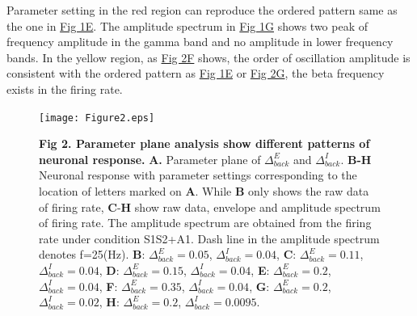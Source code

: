 \documentclass[10pt,letterpaper]{article}
\begin{document}
Parameter setting in the red region can reproduce the ordered pattern same as the one in \hyperlink{fig:fig1}{Fig 1E}. The amplitude spectrum in \hyperlink{fig:fig2}{Fig 1G} shows two peak of frequency amplitude in the gamma band and no amplitude in lower frequency bands.
In the yellow region, as \hyperlink{fig:fig2}{Fig 2F} shows, the order of oscillation amplitude is consistent with the ordered pattern as \hyperlink{fig:fig1}{Fig 1E} or \hyperlink{fig:fig2}{Fig 2G}, the beta frequency exists in the firing rate.

\begin{figure}[!h]
\begin{adjustwidth}{-2in}{0.3in} %
\centering
\texttt{[image: Figure2.eps]}
\begin{flushleft} {\bf Fig 2. Parameter plane analysis show different patterns of neuronal response.}
\textbf{A.} Parameter plane of $\Delta_{back}^{E}$ and $\Delta_{back}^{I}$. \textbf{B-H} Neuronal response with parameter settings corresponding to the location of letters marked on \textbf{A}. While \textbf{B} only shows the raw data of firing rate, \textbf{C}-\textbf{H} show raw data, envelope and amplitude spectrum of firing rate. The amplitude spectrum are obtained from the firing rate under condition S1S2+A1. Dash line in the amplitude spectrum denotes f=25(Hz). \textbf{B}: $\Delta_{back}^{E}=0.05$, $\Delta_{back}^{I}=0.04$, \textbf{C}: $\Delta_{back}^{E}=0.11$, $\Delta_{back}^{I}=0.04$, \textbf{D}: $\Delta_{back}^{E}=0.15$, $\Delta_{back}^{I}=0.04$, \textbf{E}: $\Delta_{back}^{E}=0.2$, $\Delta_{back}^{I}=0.04$, \textbf{F}: $\Delta_{back}^{E}=0.35$, $\Delta_{back}^{I}=0.04$, \textbf{G}: $\Delta_{back}^{E}=0.2$, $\Delta_{back}^{I}=0.02$, \textbf{H}: $\Delta_{back}^{E}=0.2$, $\Delta_{back}^{I}=0.0095$. 
\end{flushleft}
\hypertarget{fig:fig2}{}
\end{adjustwidth}
\end{figure}
\end{document}

